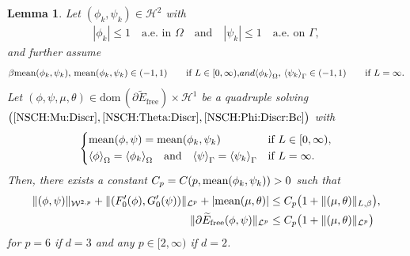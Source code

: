 \documentclass[11pt,reqno]{amsart}
\newtheorem{lemma}[theorem]{Lemma}
\theoremstyle{remark}
\numberwithin{equation}{section}
\newcommand{\abs}[1]{|#1|}
\newcommand{\norm}[1]{\| #1 \|}
\newcommand{\meano}[1]{{\langle #1 \rangle}_{\Omega}}
\newcommand{\meang}[1]{{\langle #1 \rangle}_{\Gamma}}
\newcommand{\mean}[2]{\textnormal{mean}(#1,#2)}
\newcommand{\Om}{\Omega}
\newcommand{\Ga}{\Gamma}
\newcommand{\free}{\mathrm{free}}
\begin{document}
\begin{lemma}\label{NSCH:Lemma:H^2+Subdiff}
    Let $(\phi_k,\psi_k)\in\mathcal{H}^2$ with 
    \begin{align}\label{NSCH:Lemma:H^2+Subdiff:<1}
    	\abs{\phi_k}\leq 1\quad\text{a.e.~in~}\Om \quad\text{and}\quad \abs{\psi_k} \leq 1 \quad\text{a.e.~on~}\Ga,
    \end{align}
    and further assume 
    \begin{subequations}
        \begin{align*}
            \beta\mean{\phi_k}{\psi_k}, \,\mean{\phi_k}{\psi_k}\in(-1,1) \qquad\text{if~}L\in[0,\infty),
        \end{align*}
        and
        \begin{align*}
            \meano{\phi_k}, \, \meang{\psi_k}\in(-1,1) \qquad\text{if~} L = \infty.
        \end{align*}
    \end{subequations}
    Let $(\phi,\psi,\mu,\theta)\in\mathrm{dom}\,(\partial \widetilde E_\free)\times\mathcal{H}^1$ be a quadruple solving $\big(\eqref{NSCH:Mu:Discr},\eqref{NSCH:Theta:Discr},\eqref{NSCH:Phi:Discr:Bc}\big)$ with
    \begin{align}\label{NSCH:MCL:Discrete}
        \begin{dcases}
            \mean{\phi}{\psi} = \mean{\phi_k}{\psi_k} &\textnormal{if~} L\in[0,\infty), \\
            \meano{\phi} = \meano{\phi_k} \quad\textnormal{and}\quad \meang{\psi} = \meang{\psi_k} &\textnormal{if~} L = \infty.
        \end{dcases}
    \end{align}    
	Then, there exists a constant $C_p = C(p,\mean{\phi_k}{\psi_k}) > 0$ such that
    \begin{align}
        \norm{(\phi,\psi)}_{\mathcal{W}^{2,p}} + \norm{(F_0^\prime(\phi),G_0^\prime(\psi))}_{\mathcal{L}^p} + \abs{\mean{\mu}{\theta}} &\leq C_p\big( 1 + \norm{(\mu,\theta)}_{L,\beta} \big), \label{NSCH:Lemma:Est:1}\\
        \norm{\partial \widetilde E_\free(\phi,\psi)}_{\mathcal{L}^p} &\leq C_p\big( 1 + \norm{(\mu,\theta)}_{\mathcal{L}^p}\big) \label{NSCH:Lemma:Est:2}
    \end{align}
    for $p = 6$ if $d = 3$ and any $p\in[2,\infty)$ if $d = 2$.
\end{lemma}
\end{document}
